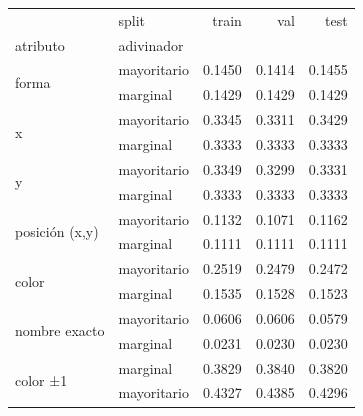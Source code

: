 \begin{tabular}{llrrr}
\toprule
 & split & train & val & test \\
atributo & adivinador &  &  &  \\
\midrule
\multirow[t]{2}{*}{forma} & mayoritario & 0.1450 & 0.1414 & 0.1455 \\
 & marginal & 0.1429 & 0.1429 & 0.1429 \\
\cline{1-5}
\multirow[t]{2}{*}{x} & mayoritario & 0.3345 & 0.3311 & 0.3429 \\
 & marginal & 0.3333 & 0.3333 & 0.3333 \\
\cline{1-5}
\multirow[t]{2}{*}{y} & mayoritario & 0.3349 & 0.3299 & 0.3331 \\
 & marginal & 0.3333 & 0.3333 & 0.3333 \\
\cline{1-5}
\multirow[t]{2}{*}{posición (x,y)} & mayoritario & 0.1132 & 0.1071 & 0.1162 \\
 & marginal & 0.1111 & 0.1111 & 0.1111 \\
\cline{1-5}
\multirow[t]{2}{*}{color} & mayoritario & 0.2519 & 0.2479 & 0.2472 \\
 & marginal & 0.1535 & 0.1528 & 0.1523 \\
\cline{1-5}
\multirow[t]{2}{*}{nombre exacto} & mayoritario & 0.0606 & 0.0606 & 0.0579 \\
 & marginal & 0.0231 & 0.0230 & 0.0230 \\
\cline{1-5}
\multirow[t]{2}{*}{color ±1} & marginal & 0.3829 & 0.3840 & 0.3820 \\
 & mayoritario & 0.4327 & 0.4385 & 0.4296 \\
\cline{1-5}
\bottomrule
\end{tabular}
